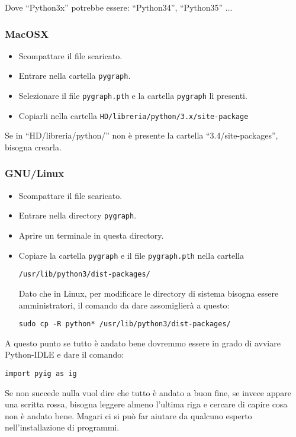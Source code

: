 Dove ``Python3x'' potrebbe essere: ``Python34'', ``Python35'' ...

\subsubsection*{MacOSX}

\begin{itemize} [noitemsep]
\item {} Scompattare il file scaricato.
\item {} Entrare nella cartella \texttt{pygraph}.
\item {} Selezionare il file \texttt{pygraph.pth} e la cartella 
  \texttt{pygraph} lì presenti.
\item {} Copiarli nella cartella \texttt{HD/libreria/python/3.x/site-package}
\end{itemize}

Se in ``HD/libreria/python/'' non è presente la cartella 
``3.4/site-packages'', bisogna crearla.

\subsubsection*{GNU/Linux}

\begin{itemize} [noitemsep]
\item {} Scompattare il file scaricato.
\item {} Entrare nella directory \texttt{pygraph}.
\item {} Aprire un terminale in questa directory.
\item {} Copiare la cartella \texttt{pygraph} e il file \texttt{pygraph.pth}
  nella cartella
  
  \texttt{/usr/lib/python3/dist-packages/}
  
  Dato che in Linux, per modificare le directory di sistema bisogna essere 
  amministratori, il comando da dare assomiglierà a questo:
  
  \texttt{sudo cp -R python* /usr/lib/python3/dist-packages/}
\end{itemize}

A questo punto se tutto è andato bene dovremmo essere in grado di avviare 
Python-IDLE e dare il comando:

\texttt{import pyig as ig}

Se non succede nulla vuol dire che tutto è andato a buon fine, 
se invece appare una scritta rossa, bisogna leggere almeno l'ultima riga
e cercare di capire cosa non è andato bene. Magari ci si può far aiutare
da qualcuno esperto nell'installazione di programmi.

